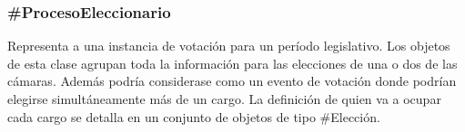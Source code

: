 \subsubsection{\#ProcesoEleccionario}

Representa a una instancia de votación para un período
legislativo. Los objetos de esta clase agrupan toda la información
para las elecciones de una o dos de las cámaras. Además podría
considerase como un evento de votación donde podrían elegirse
simultáneamente más de un cargo. La definición de quien va a ocupar
cada cargo se detalla en un conjunto de objetos de tipo \#Elección.

\begin{description}
  
\end{description}
